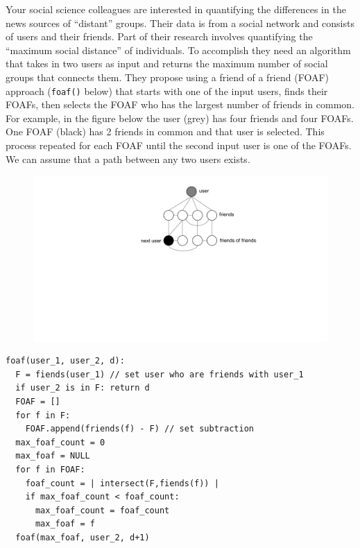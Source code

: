 \documentclass[12pt]{article}
\begin{document}
\renewcommand{\headrulewidth}{0.5pt}

\phantom{Test}
Your social science colleagues are interested in quantifying the differences in
the news sources of ``distant'' groups. Their data is from a social network and
consists of users and their friends. Part of their research involves
quantifying the ``maximum social distance'' of individuals. To accomplish they
need an algorithm that takes in two users as input and returns the maximum
number of social groups that connects them. They propose using a friend of a
friend (FOAF) approach ({\tt foaf()} below) that starts with one of the input
users, finds their FOAFs, then selects the FOAF who has the largest number of
friends in common. For example, in the figure below the user (grey) has four
friends and four FOAFs. One FOAF (black) has 2 friends in common and that user
is selected.  This process repeated for each FOAF until the second input user
is one of the FOAFs. We can assume that a path between any two users exists.
\begin{figure}[h!]
\begin{center}
\includegraphics[scale=0.5]{EIB6_graph}
\end{center}
\end{figure}
\begin{small}
\begin{verbatim}
foaf(user_1, user_2, d):
  F = fiends(user_1) // set user who are friends with user_1
  if user_2 is in F: return d
  FOAF = []
  for f in F:
    FOAF.append(friends(f) - F) // set subtraction
  max_foaf_count = 0
  max_foaf = NULL
  for f in FOAF:
    foaf_count = | intersect(F,fiends(f)) |
    if max_foaf_count < foaf_count:
      max_foaf_count = foaf_count
      max_foaf = f
  foaf(max_foaf, user_2, d+1)
\end{verbatim}
\end{small}
\end{document}
